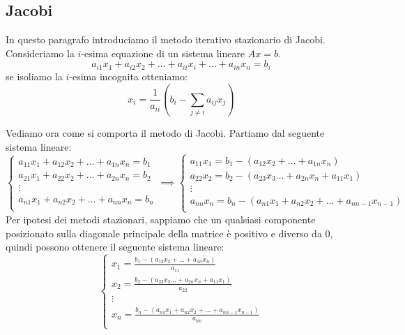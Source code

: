 \subsection{Jacobi}
In questo paragrafo introduciamo il metodo iterativo stazionario di Jacobi.
Consideriamo la $i$-esima equazione di un sistema lineare $Ax = b$.
\begin{equation*}
    a_{i1}x_1 + a_{i2}x_2 + \dots + a_{ii}x_i + \dots + a_{in}x_n = b_i
\end{equation*}
se isoliamo la $i$-esima incognita otteniamo:
\begin{equation*}
    x_i = \frac{1}{a_{ii}}(b_i - \sum_{j \neq i}a_{ij}x_j)
\end{equation*}

Vediamo ora come si comporta il metodo di Jacobi. Partiamo dal seguente sistema
lineare:
\begin{equation*}
    \begin{cases}
        a_{11}x_1 + a_{12} x_2 + \dots + a_{1n} x_n= b_1 \\
        a_{21}x_1 + a_{22} x_2 + \dots + a_{2n} x_n= b_2 \\
        \vdots                                           \\
        a_{n1}x_1 + a_{n2} x_2 + \dots + a_{nn} x_n= b_n \\
    \end{cases}\implies
    \begin{cases}
        a_{11}x_1 = b_1 - (a_{12} x_2 + \dots + a_{1n} x_n)                   \\
        a_{22} x_2 = b_2 - (a_{23} x_3\dots + a_{2n} x_n + a_{11}x_1)         \\
        \vdots                                                                \\
        a_{nn} x_n= b_n - (a_{n1}x_1 + a_{n2} x_2 + \dots + a_{nn-1} x_{n-1}) \\
    \end{cases}
\end{equation*}
Per ipotesi dei metodi stazionari, sappiamo che un qualsiasi componente
posizionato sulla diagonale principale della matrice è positivo e diverso da $0$,
quindi possono ottenere il seguente sistema lineare:
\begin{equation*}
    \begin{cases}
        x_1 = \frac{b_1 - (a_{12} x_2 + \dots + a_{1n} x_n)}{ a_{11}}                 \\
        x_2 =\frac{ b_2 - (a_{23} x_3\dots + a_{2n} x_n + a_{11}x_1)}{a_{22}}         \\
        \vdots                                                                        \\
        x_n= \frac{b_n - (a_{n1}x_1 + a_{n2} x_2 + \dots + a_{nn-1} x_{n-1})}{a_{nn}} \\
    \end{cases}
\end{equation*}
